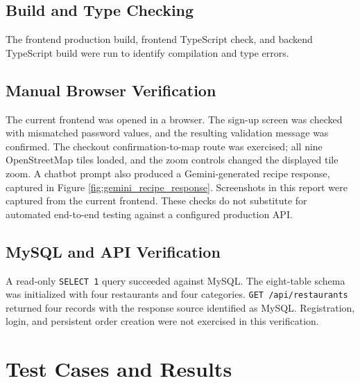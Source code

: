 \subsection{Build and Type Checking}
The frontend production build, frontend TypeScript check, and backend TypeScript build were run to identify compilation and type errors.

\subsection{Manual Browser Verification}
The current frontend was opened in a browser. The sign-up screen was checked with mismatched password values, and the resulting validation message was confirmed. The checkout confirmation-to-map route was exercised; all nine OpenStreetMap tiles loaded, and the zoom controls changed the displayed tile zoom. A chatbot prompt also produced a Gemini-generated recipe response, captured in Figure \ref{fig:gemini_recipe_response}. Screenshots in this report were captured from the current frontend. These checks do not substitute for automated end-to-end testing against a configured production API.

\subsection{MySQL and API Verification}
A read-only \texttt{SELECT 1} query succeeded against MySQL. The eight-table schema was initialized with four restaurants and four categories. \texttt{GET /api/restaurants} returned four records with the response source identified as MySQL. Registration, login, and persistent order creation were not exercised in this verification.

\section{Test Cases and Results}

